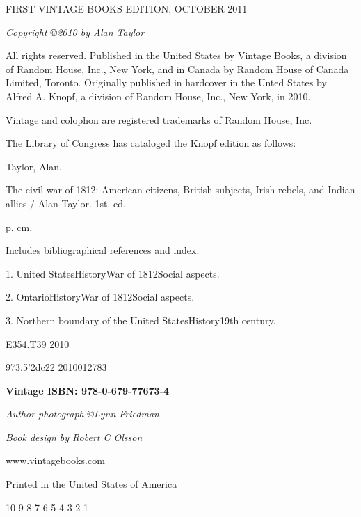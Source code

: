 \begin{tcolorbox}[enhanced,width=4.2in,left=.4in, right=.4in,
   drop fuzzy shadow southeast,
    boxrule=0.4pt,sharp corners,colframe=black!80!black,colback=white!10]

\bigskip
\bigskip
\bigskip
\bigskip

\begin{center}

{\scriptsize FIRST VINTAGE BOOKS EDITION, OCTOBER 2011

\medskip

\emph{Copyright \copyright 2010 by Alan Taylor}

\medskip

All rights reserved. Published in the United States by Vintage Books,
a division of Random House, Inc., New York, and in Canada by
Random House of Canada Limited, Toronto. Originally published in hardcover in the Unted States by Alfred A. Knopf, a division of Random House, Inc., New York, in 2010.

\medskip

Vintage and colophon are registered trademarks of Random House, Inc.

\medskip

The Library of Congress has cataloged the Knopf edition as follows:

Taylor, Alan.

The civil war of 1812: American citizens, British subjects, Irish rebels, and Indian allies / Alan Taylor. \textemdash 1st. ed.

p. cm.

Includes bibliographical references and index.

1. United States\textemdash History\textemdash War of 1812\textemdash Social aspects.

2. Ontario\textemdash History\textemdash War of 1812\textemdash Social aspects.

3. Northern boundary of the United States\textemdash History\textemdash 19th century.

E354.T39 2010

973.5'2\textemdash dc22 2010012783

\textbf{Vintage ISBN: 978-0-679-77673-4}

\emph{Author photograph} \copyright \emph{Lynn Friedman}

\emph{Book design by Robert C Olsson}

www.vintagebooks.com

Printed in the United States of America

10 9 8 7 6 5 4 3 2 1

}


\end{center}
\bigskip
\smallskip
\smallskip

\end{tcolorbox}





